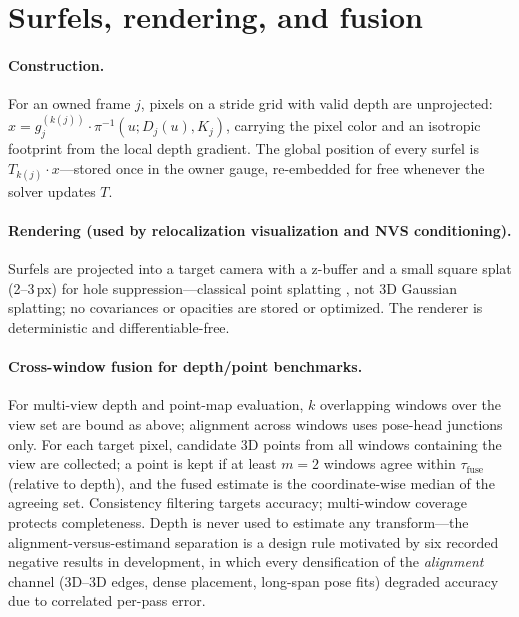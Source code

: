\section{Surfels, rendering, and fusion}
\label{app:surfel}
\paragraph{Construction.}
For an owned frame $j$, pixels on a stride grid with valid depth are
unprojected: $x = g_j^{(k(j))}\cdot \pi^{-1}(u; D_j(u), K_j)$, carrying the
pixel color and an isotropic footprint from the local depth gradient. The
global position of every surfel is $T_{k(j)}\cdot x$---stored once in the
owner gauge, re-embedded for free whenever the solver updates $T$.

\paragraph{Rendering (used by relocalization visualization and NVS
conditioning).}
Surfels are projected into a target camera with a z-buffer and a small
square splat (2--3\,px) for hole suppression---classical point splatting
\citep{surfels}, not 3D Gaussian splatting; no covariances or opacities are
stored or optimized. The renderer is deterministic and differentiable-free.

\paragraph{Cross-window fusion for depth/point benchmarks.}
\label{app:fusion}
For multi-view depth and point-map evaluation, $k$ overlapping windows over
the view set are bound as above; alignment across windows uses pose-head
junctions only. For each target pixel, candidate 3D points from all windows
containing the view are collected; a point is kept if at least $m{=}2$
windows agree within $\tau_{\text{fuse}}$ (relative to depth), and the
fused estimate is the coordinate-wise median of the agreeing set.
Consistency filtering targets accuracy; multi-window coverage protects
completeness. Depth is never used to estimate any transform---the
alignment-versus-estimand separation is a design rule motivated by six
recorded negative results in development, in which every densification of
the \emph{alignment} channel (3D--3D edges, dense placement, long-span pose
fits) degraded accuracy due to correlated per-pass error.

